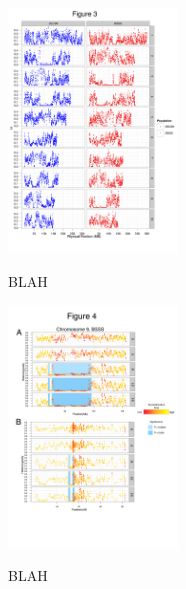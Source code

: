 \begin{figure}[tb]   
  \begin{center}
   \vspace{-0mm}
   \includegraphics[width=0.4\textwidth]{fig3}
   \renewcommand{\baselinestretch}{0.9}
   \vspace{-3mm}
   \caption{BLAH} 
\vspace{-6mm}
    \label{fig:heterotic}
  \end{center}
\end{figure}

\begin{figure}[tb]   
  \begin{center}
   \vspace{-0mm}
   \includegraphics[width=0.4\textwidth]{fig4}
   \renewcommand{\baselinestretch}{0.9}
   \vspace{-3mm}
   \caption{BLAH} 
\vspace{-6mm}
    \label{fig:genphys}
  \end{center}
\end{figure}

